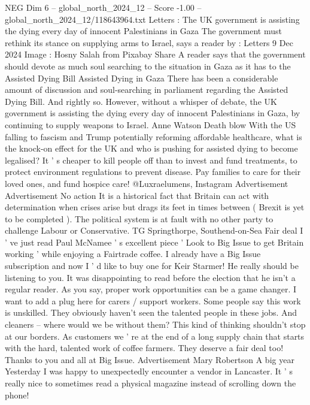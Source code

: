 \begin{textsample}{NEG Dim 6 – global\_north\_2024\_12 – Score -1.00 – global\_north\_2024\_12/118643964.txt}  \label{ex:f6_neg_190}
Letters : The UK government is assisting the dying every day of innocent Palestinians in Gaza The government must rethink its stance on supplying arms to Israel, says a reader by : Letters 9 Dec 2024 Image : Hosny Salah from Pixabay Share A reader says that the government should devote as much soul searching to the situation in Gaza as it has to the Assisted Dying Bill Assisted Dying in Gaza There has been a considerable amount of discussion and soul-searching in parliament regarding the Assisted Dying Bill.
And rightly so.
However, without a whisper of debate, the UK government is assisting the dying every day of innocent Palestinians in Gaza, by continuing to supply weapons to Israel.
Anne Watson Death blow With the US falling to fascism and Trump potentially reforming affordable healthcare, what is the knock-on effect for the UK and who is pushing for assisted dying to become legalised?
It ' s cheaper to kill people off than to invest and fund treatments, to protect environment regulations to prevent disease.
Pay families to care for their loved ones, and fund hospice care! @Luxraelumens, Instagram Advertisement Advertisement No action It is a historical fact that Britain can act with determination when crises arise but drags its feet in times between ( Brexit is yet to be completed ).
The political system is at fault with no other party to challenge Labour or Conservative.
TG Springthorpe, Southend-on-Sea Fair deal I ' ve just read Paul McNamee ' s excellent piece ' Look to Big Issue to get Britain working ' while enjoying a Fairtrade coffee.
I already have a Big Issue subscription and now I ' d like to buy one for Keir Starmer!
He really should be listening to you.
It was disappointing to read before the election that he isn't a regular reader.
As you say, proper work opportunities can be a game changer.
I want to add a plug here for carers / support workers.
Some people say this work is unskilled.
They obviously haven't seen the talented people in these jobs.
And cleaners -- where would we be without them?
This kind of thinking shouldn't stop at our borders.
As customers we ' re at the end of a long supply chain that starts with the hard, talented work of coffee farmers.
They deserve a fair deal too!
Thanks to you and all at Big Issue.
Advertisement Mary Robertson A big year Yesterday I was happy to unexpectedly encounter a vendor in Lancaster.
It ' s really nice to sometimes read a physical magazine instead of scrolling down the phone!

\end{textsample}
